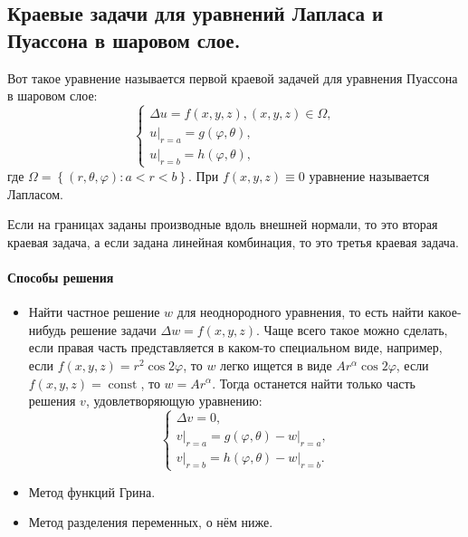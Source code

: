 \subsection{Краевые задачи для уравнений Лапласа и Пуассона в шаровом слое.}

Вот такое уравнение называется первой краевой задачей для уравнения Пуассона в шаровом слое:
\[
  \begin{cases}
    \Delta u = f(x, y, z), (x, y, z) \in \Omega, \\
    \left. u \right|_{r = a} = g(\varphi, \theta), \\
    \left. u \right|_{r = b} = h(\varphi, \theta),
  \end{cases}
\]
где $\Omega = \left\{ (r, \theta, \varphi) : a < r < b \right\} $.
При $f(x, y, z) \equiv 0$ уравнение называется Лапласом.

Если на границах заданы производные вдоль внешней нормали, то это вторая краевая задача,
а если задана линейная комбинация, то это третья краевая задача.

\paragraph{Способы решения}
\begin{itemize}
  \item Найти частное решение $w$ для неоднородного уравнения, то есть найти какое-нибудь 
    решение задачи $\Delta w = f(x, y, z)$. Чаще всего такое можно сделать, если правая часть 
    представляется в каком-то специальном виде, например,
    если $f(x, y, z) = r^2 \cos 2\varphi$, то $w$ легко ищется в виде $A r^\alpha \cos 2\varphi$,
    если $f(x, y, z) = \operatorname{const}$, то $w = A r^\alpha$.
    Тогда останется найти только часть решения $v$, удовлетворяющую уравнению:
    \[
      \begin{cases}
        \Delta v = 0, \\
        \left. v \right|_{r=a} = g(\varphi, \theta) - \left. w \right|_{r=a}, \\
        \left. v \right|_{r=b} = h(\varphi, \theta) - \left. w \right|_{r=b}.
      \end{cases}
    \]

  \item Метод функций Грина.

  \item Метод разделения переменных, о нём ниже.
\end{itemize}

